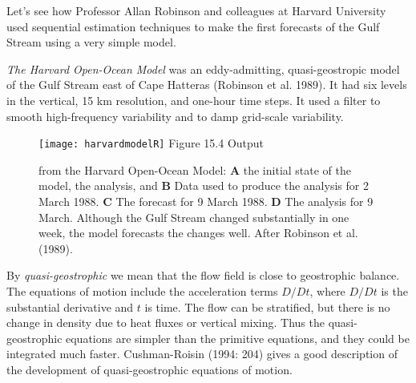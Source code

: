 Let's see how Professor Allan Robinson and colleagues at Harvard University used sequential estimation techniques to make the first forecasts of the Gulf Stream using a very simple model.

\textit{The Harvard Open-Ocean Model} was an eddy-admitting, quasi-geostrop\-ic
mod\-el of the
Gulf Stream east of Cape Hatteras (Robinson et al. 1989). It had
six levels in the vertical, 15 km resolution, and one-hour time steps. It used a filter
to smooth high-frequency variability and to damp grid-scale variability.

\begin{figure}[t!]
\texttt{[image: harvardmodelR]}
\footnotesize
Figure 15.4 Output \rule{0mm}{4ex} from the Harvard Open-Ocean Model: \textbf{A} the
initial state of the model, the analysis, and \textbf{B} Data used to produce the
analysis for 2 March 1988. \textbf{C} The forecast for 9 March 1988. \textbf{D}
The analysis for 9 March. Although the Gulf Stream changed
substantially in one week, the model forecasts the changes well. After Robinson et al. (1989).
\label{fig:harvardmodel}
\vspace{-3ex}
\end{figure}

By \textit{quasi-geostrophic} we mean that the flow
field is close to geostrophic balance. The equations of motion include the
acceleration terms $D/Dt$, where $D/Dt$ is the substantial derivative and $t$ is
time. The flow can be stratified, but there is no change in density due to heat
fluxes or vertical mixing. Thus the quasi-geostrophic equations are simpler than the primitive
equations, and they could be integrated much faster. Cushman-Roisin (1994: 204) gives a good
description of the development of quasi-geostrophic equations of motion.

